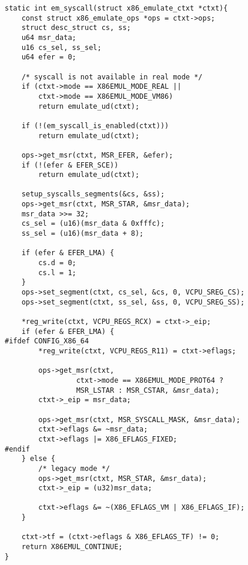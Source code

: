 \documentclass{report}
\begin{document}
\begin{spacing}{1.5}
\begin{lstlisting}[caption={/arch/x86/kvm/emulate.c:2712 | Linux kernel V5.18.8},captionpos=b]
static int em_syscall(struct x86_emulate_ctxt *ctxt){
    const struct x86_emulate_ops *ops = ctxt->ops;
    struct desc_struct cs, ss;
    u64 msr_data;
    u16 cs_sel, ss_sel;
    u64 efer = 0;

    /* syscall is not available in real mode */
    if (ctxt->mode == X86EMUL_MODE_REAL ||
        ctxt->mode == X86EMUL_MODE_VM86)
        return emulate_ud(ctxt);

    if (!(em_syscall_is_enabled(ctxt)))
        return emulate_ud(ctxt);

    ops->get_msr(ctxt, MSR_EFER, &efer);
    if (!(efer & EFER_SCE))
        return emulate_ud(ctxt);

    setup_syscalls_segments(&cs, &ss);
    ops->get_msr(ctxt, MSR_STAR, &msr_data);
    msr_data >>= 32;
    cs_sel = (u16)(msr_data & 0xfffc);
    ss_sel = (u16)(msr_data + 8);

    if (efer & EFER_LMA) {
        cs.d = 0;
        cs.l = 1;
    }
    ops->set_segment(ctxt, cs_sel, &cs, 0, VCPU_SREG_CS);
    ops->set_segment(ctxt, ss_sel, &ss, 0, VCPU_SREG_SS);

    *reg_write(ctxt, VCPU_REGS_RCX) = ctxt->_eip;
    if (efer & EFER_LMA) {
#ifdef CONFIG_X86_64
        *reg_write(ctxt, VCPU_REGS_R11) = ctxt->eflags;

        ops->get_msr(ctxt,
                 ctxt->mode == X86EMUL_MODE_PROT64 ?
                 MSR_LSTAR : MSR_CSTAR, &msr_data);
        ctxt->_eip = msr_data;

        ops->get_msr(ctxt, MSR_SYSCALL_MASK, &msr_data);
        ctxt->eflags &= ~msr_data;
        ctxt->eflags |= X86_EFLAGS_FIXED;
#endif
    } else {
        /* legacy mode */
        ops->get_msr(ctxt, MSR_STAR, &msr_data);
        ctxt->_eip = (u32)msr_data;

        ctxt->eflags &= ~(X86_EFLAGS_VM | X86_EFLAGS_IF);
    }

    ctxt->tf = (ctxt->eflags & X86_EFLAGS_TF) != 0;
    return X86EMUL_CONTINUE;
}
\end{lstlisting}



\end{spacing}
\end{document}
